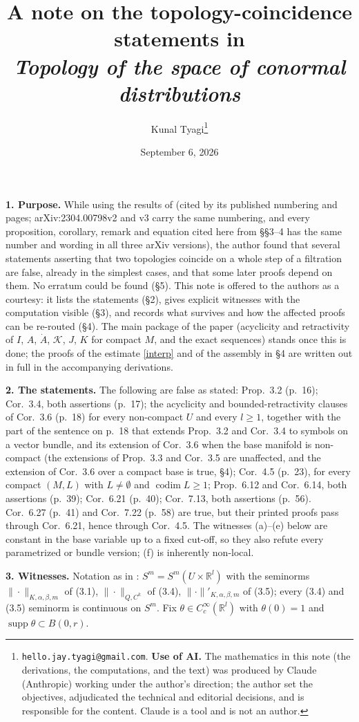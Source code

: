 \documentclass[11pt]{article}
\title{\large A note on the topology-coincidence statements in\\ \emph{Topology of the space of conormal distributions}}
\author{\normalsize Kunal Tyagi\thanks{\texttt{hello.jay.tyagi@gmail.com}. \textbf{Use of AI.} The mathematics in this note (the derivations, the computations, and the text) was produced by Claude (Anthropic) working under the author's direction; the author set the objectives, adjudicated the technical and editorial decisions, and is responsible for the content. Claude is a tool and is not an author.}}
\date{\vspace{-1ex}\normalsize September 6, 2026}
\newcommand{\R}{\mathbb{R}}
\newcommand{\supp}{\operatorname{supp}}
\begin{document}
\maketitle
\vspace{-2em}

\noindent\textbf{1. Purpose.}
While using the results of \cite{ALKL24} (cited by its published numbering and pages; arXiv:2304.00798v2 and v3 carry the same numbering, and every proposition, corollary, remark and equation cited here from \S\S3--4 has the same number and wording in all three arXiv versions), the author found that several statements asserting that two topologies coincide on a whole step of a filtration are false, already in the simplest cases, and that some later proofs depend on them. No erratum could be found (\S5). This note is offered to the authors as a courtesy: it lists the statements (\S2), gives explicit witnesses with the computation visible (\S3), and records what survives and how the affected proofs can be re-routed (\S4). The main package of the paper (acyclicity and retractivity of $I$, $A$, $\dot A$, $\mathcal K$, $J$, $K$ for compact $M$, and the exact sequences) stands once this is done; the proofs of the estimate \eqref{interp} and of the assembly in \S4 are written out in full in the accompanying derivations.

\medskip\noindent\textbf{2. The statements.}
The following are false as stated: Prop.~3.2 (p.~16); Cor.~3.4, both assertions (p.~17); the acyclicity and bounded-retractivity clauses of Cor.~3.6 (p.~18) for every non-compact $U$ and every $l\ge1$, together with the part of the sentence on p.~18 that extends Prop.~3.2 and Cor.~3.4 to symbols on a vector bundle, and its extension of Cor.~3.6 when the base manifold is non-compact (the extensions of Prop.~3.3 and Cor.~3.5 are unaffected, and the extension of Cor.~3.6 over a compact base is true, \S4); Cor.~4.5 (p.~23), for every compact $(M,L)$ with $L\ne\emptyset$ and $\operatorname{codim}L\ge1$; Prop.~6.12 and Cor.~6.14, both assertions (p.~39); Cor.~6.21 (p.~40); Cor.~7.13, both assertions (p.~56). Cor.~6.27 (p.~41) and Cor.~7.22 (p.~58) are true, but their printed proofs pass through Cor.~6.21, hence through Cor.~4.5. The witnesses (a)--(e) below are constant in the base variable up to a fixed cut-off, so they also refute every parametrized or bundle version; (f) is inherently non-local.

\medskip\noindent\textbf{3. Witnesses.}
Notation as in \cite{ALKL24}: $S^m=S^m(U\times\R^l)$ with the seminorms $\|\cdot\|_{K,\alpha,\beta,m}$ of (3.1), $\|\cdot\|_{Q,C^k}$ of (3.4), $\|\cdot\|'_{K,\alpha,\beta,m}$ of (3.5); every (3.4) and (3.5) seminorm is continuous on $S^m$. Fix $\theta\in C_c^\infty(\R^l)$ with $\theta(0)=1$ and $\supp\theta\subset B(0,r)$.
\end{document}
